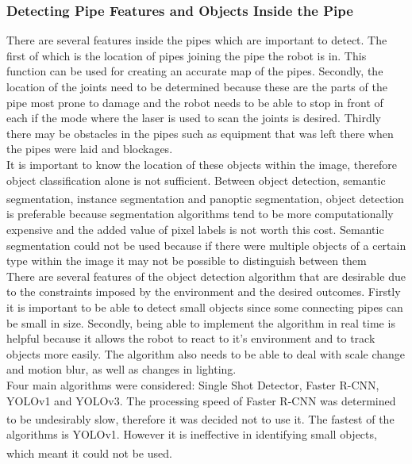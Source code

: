 \documentclass[11pt]{article}		%
\newcommand{\supercite}[1]{\textsuperscript{\cite{#1}}}		%
\begin{document}
			\supercite{CrackGAN1}
		
        	
				
		\subsubsection{Detecting Pipe Features and Objects Inside the Pipe}
		
			There are several features inside the pipes which are important to detect. 
			The first of which is the location of pipes joining the pipe the robot is in. This function can be used for creating an accurate map of the pipes.
			Secondly, the location of the joints need to be determined because these are the parts of the pipe most prone to damage and the robot needs to be able to stop in front of each if the mode where the laser is used to scan the joints is desired.
			Thirdly there may be obstacles in the pipes such as equipment that was left there when the pipes were laid and blockages.
			\\
	        It is important to know the location of these objects within the image, therefore object classification alone is not sufficient. 
	        Between object detection, semantic segmentation, instance segmentation and panoptic segmentation\supercite{segmentation}, object detection is preferable because segmentation algorithms tend to be more computationally expensive and the added value of pixel labels is not worth this cost. 
	        Semantic segmentation could not be used because if there were multiple objects of a certain type within the image it may not be possible to distinguish between them
	        \\
	        There are several features of the object detection algorithm that are desirable due to the constraints imposed by the environment and the desired outcomes. 
	        Firstly it is important to be able to detect small objects since some connecting pipes can be small in size. 
	        Secondly, being able to implement the algorithm in real time is helpful because it allows the robot to react to it's environment and to track objects more easily.
	        The algorithm also needs to be able to deal with scale change and motion blur, as well as changes in lighting.
	        \\
	        Four main algorithms were considered: Single Shot Detector, Faster R-CNN, YOLOv1 and YOLOv3. 
	        The processing speed of Faster R-CNN was determined to be undesirably slow, therefore it was decided not to use it. \supercite{YOLO}
	        The fastest of the algorithms is YOLOv1. However it is ineffective in identifying small objects, which meant it could not be used. \supercite{YOLO}
\end{document}
